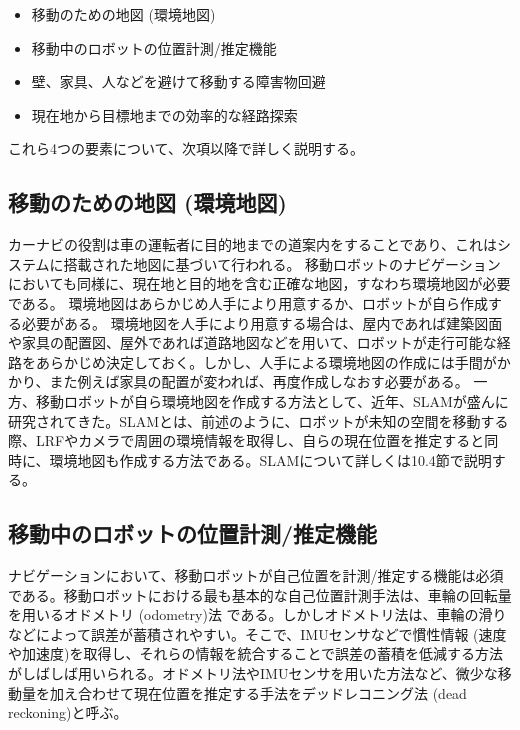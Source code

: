 \begin{itemize}[leftmargin=*]
\setcounter{num}{0}
\item{}\circled{\thenum} 移動のための地図   (環境地図)
\item{}\circled{\thenum} 移動中のロボットの位置計測/推定機能
\item{}\circled{\thenum} 壁、家具、人などを避けて移動する障害物回避
\item{}\circled{\thenum} 現在地から目標地までの効率的な経路探索
\end{itemize}

これら4つの要素について、次項以降で詳しく説明する。\\

\subsection{移動のための地図 (環境地図)}

カーナビの役割は車の運転者に目的地までの道案内をすることであり、これはシステムに搭載された地図に基づいて行われる。 移動ロボットのナビゲーションにおいても同様に、現在地と目的地を含む正確な地図，すなわち環境地図が必要である。  環境地図はあらかじめ人手により用意するか、ロボットが自ら作成する必要がある。
環境地図を人手により用意する場合は、屋内であれば建築図面や家具の配置図、屋外であれば道路地図などを用いて、ロボットが走行可能な経路をあらかじめ決定しておく。しかし、人手による環境地図の作成には手間がかかり、また例えば家具の配置が変われば、再度作成しなおす必要がある。
一方、移動ロボットが自ら環境地図を作成する方法として、近年、SLAMが盛んに研究されてきた。SLAMとは、前述のように、ロボットが未知の空間を移動する際、LRFやカメラで周囲の環境情報を取得し、自らの現在位置を推定すると同時に、環境地図も作成する方法である。SLAMについて詳しくは10.4節で説明する。

\subsection{移動中のロボットの位置計測/推定機能}

ナビゲーションにおいて、移動ロボットが自己位置を計測/推定する機能は必須である。移動ロボットにおける最も基本的な自己位置計測手法は、車輪の回転量を用いるオドメトリ (odometry)法  である。しかしオドメトリ法は、車輪の滑りなどによって誤差が蓄積されやすい。そこで、IMUセンサなどで慣性情報 (速度や加速度)を取得し、それらの情報を統合することで誤差の蓄積を低減する方法がしばしば用いられる。オドメトリ法やIMUセンサを用いた方法など、微少な移動量を加え合わせて現在位置を推定する手法をデッドレコニング法 (dead reckoning)と呼ぶ。

